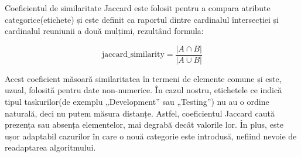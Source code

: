 Coeficientul de similaritate Jaccard este folosit pentru a compara atribute categorice(etichete) și este definit ca raportul dintre cardinalul întersecției și cardinalul reuniunii a două mulțimi, rezultând formula:

\[
\text{jaccard_similarity} = \frac{|A \cap B|}{|A \cup B|}
\]


Acest coeficient măsoară similaritatea în termeni de elemente comune și este, uzual, folosită pentru date non-numerice. În cazul nostru, etichetele ce indică tipul taskurilor(de exemplu „Development” sau „Testing”) nu au o ordine naturală, deci nu putem măsura distanțe. Astfel, coeficientul Jaccard caută prezența sau absența elementelor, mai degrabă decât valorile lor. În plus, este ușor adaptabil cazurilor în care o nouă categorie este introdusă, nefiind nevoie de readaptarea algoritmului.